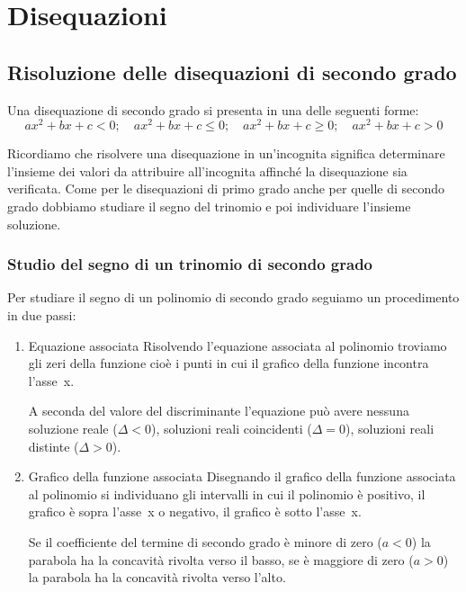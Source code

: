 


\chapter{Disequazioni}

\section{Risoluzione delle disequazioni di secondo grado}
\label{sec:diseq_secondo_grado}

Una disequazione di secondo grado si presenta in una delle seguenti forme:
\[ax^2+bx+c < 0;\quad ax^2+bx+c \leqslant 0;
  \quad ax^2+bx+c\geqslant0; \quad ax^2+bx+c > 0\]

Ricordiamo che risolvere una disequazione in un'incognita significa 
determinare l'insieme dei valori da attribuire all'incognita affinché la 
disequazione sia verificata.
Come per le disequazioni di primo grado anche per quelle di secondo grado
dobbiamo studiare il segno del trinomio e poi individuare l'insieme soluzione.

\subsection{Studio del segno di un trinomio di secondo grado}
\label{subsec:diseq_trinomio}

Per studiare il segno di un polinomio di secondo grado seguiamo un 
procedimento in due passi:

\begin{enumerate}
 \item Equazione associata
Risolvendo l'equazione associata al polinomio troviamo gli zeri della 
funzione cioè i punti in cui il grafico della funzione incontra l'asse~x. 

A seconda del valore del discriminante l'equazione può avere 
nessuna soluzione reale (\(\Delta<0\)), 
soluzioni reali coincidenti (\(\Delta=0\)), 
soluzioni reali distinte (\(\Delta>0\)).

 \item Grafico della funzione associata
Disegnando il grafico della funzione associata al polinomio si individuano 
gli intervalli in cui il polinomio è positivo, il grafico è sopra l'asse~x 
o negativo, il grafico è sotto l'asse~x.

Se il coefficiente del termine di secondo grado è minore di zero (\(a<0\)) 
la parabola ha la concavità rivolta verso il basso, se è maggiore di zero 
(\(a>0\)) la parabola ha la concavità rivolta verso l'alto. 
\end{enumerate}

